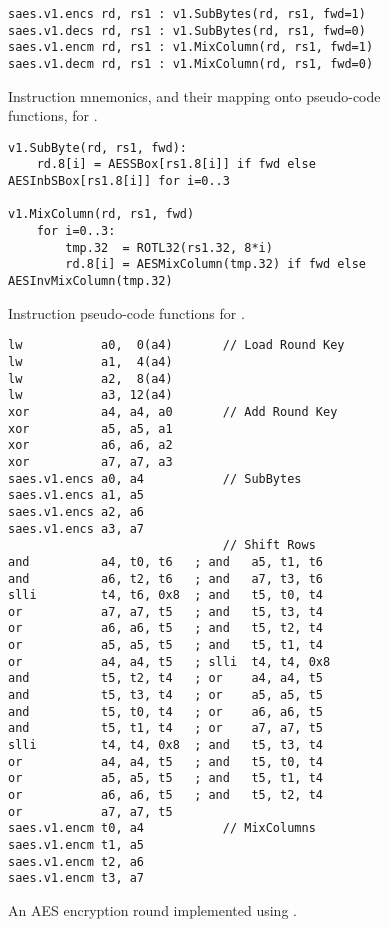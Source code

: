 
\vspace*{\fill}

\begin{figure}[!h]
\begin{lstlisting}[language=pseudo,style=block]
saes.v1.encs rd, rs1 : v1.SubBytes(rd, rs1, fwd=1)
saes.v1.decs rd, rs1 : v1.SubBytes(rd, rs1, fwd=0)
saes.v1.encm rd, rs1 : v1.MixColumn(rd, rs1, fwd=1)
saes.v1.decm rd, rs1 : v1.MixColumn(rd, rs1, fwd=0)
\end{lstlisting}
\caption{
  Instruction mnemonics, and their mapping onto pseudo-code functions, for .
}
\label{fig:v1:mnemonics}
\end{figure}

\begin{figure}[!h]
\begin{lstlisting}[language=pseudo,style=block]
v1.SubByte(rd, rs1, fwd):
    rd.8[i] = AESSBox[rs1.8[i]] if fwd else AESInbSBox[rs1.8[i]] for i=0..3

v1.MixColumn(rd, rs1, fwd)
    for i=0..3:
        tmp.32  = ROTL32(rs1.32, 8*i)
        rd.8[i] = AESMixColumn(tmp.32) if fwd else AESInvMixColumn(tmp.32)
\end{lstlisting}
\caption{
  Instruction pseudo-code functions for .
}
\label{fig:v1:pseudo}
\end{figure}

\begin{figure}[!h]
\begin{lstlisting}[language=pseudo,style=block]
lw           a0,  0(a4)       // Load Round Key
lw           a1,  4(a4)
lw           a2,  8(a4)
lw           a3, 12(a4)
xor          a4, a4, a0       // Add Round Key
xor          a5, a5, a1
xor          a6, a6, a2
xor          a7, a7, a3
saes.v1.encs a0, a4           // SubBytes
saes.v1.encs a1, a5
saes.v1.encs a2, a6
saes.v1.encs a3, a7
                              // Shift Rows
and          a4, t0, t6   ; and   a5, t1, t6
and          a6, t2, t6   ; and   a7, t3, t6
slli         t4, t6, 0x8  ; and   t5, t0, t4
or           a7, a7, t5   ; and   t5, t3, t4
or           a6, a6, t5   ; and   t5, t2, t4
or           a5, a5, t5   ; and   t5, t1, t4
or           a4, a4, t5   ; slli  t4, t4, 0x8
and          t5, t2, t4   ; or    a4, a4, t5
and          t5, t3, t4   ; or    a5, a5, t5
and          t5, t0, t4   ; or    a6, a6, t5
and          t5, t1, t4   ; or    a7, a7, t5
slli         t4, t4, 0x8  ; and   t5, t3, t4
or           a4, a4, t5   ; and   t5, t0, t4
or           a5, a5, t5   ; and   t5, t1, t4
or           a6, a6, t5   ; and   t5, t2, t4
or           a7, a7, t5
saes.v1.encm t0, a4           // MixColumns
saes.v1.encm t1, a5
saes.v1.encm t2, a6
saes.v1.encm t3, a7
\end{lstlisting}
\caption{
  An AES encryption round implemented using .
}
\label{fig:v1:round}
\end{figure}

\vspace*{\fill}

